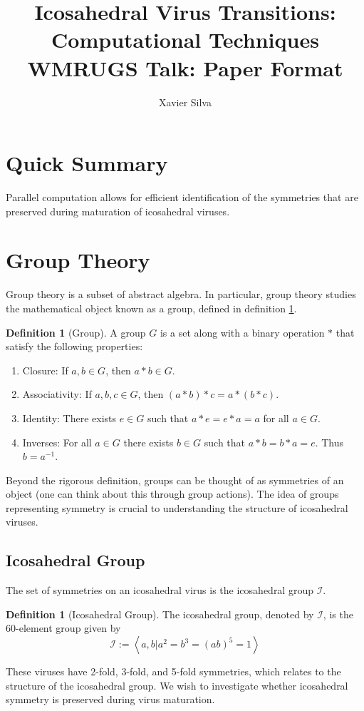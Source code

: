 \documentclass[a4paper,10pt]{article}
\title{Icosahedral Virus Transitions: Computational Techniques \\ \large WMRUGS Talk: Paper Format}
\author{Xavier Silva}
\theoremstyle{plain}
\theoremstyle{definition}
\newtheorem{Definition}[Theorem]{Definition}
\theoremstyle{remark}
\newcommand{\generatedby}[1]{\left\langle#1\right\rangle}
\begin{document}
\maketitle
\tableofcontents

\section{Quick Summary}
Parallel computation allows for efficient identification of the symmetries that are preserved during maturation of icosahedral viruses.

\section{Group Theory}
Group theory is a subset of abstract algebra.
In particular, group theory studies the mathematical object known as a group, defined in definition \ref{def:group}.
\begin{Definition}[Group]
    \label{def:group}
    A group \(G\) is a set along with a binary operation \(*\) that satisfy the following properties:
    \begin{enumerate}
        \item Closure: If \(a, b \in G\), then \(a*b \in G\).
        \item Associativity: If \(a, b, c \in G\), then \((a*b)*c = a*(b*c)\).
        \item Identity: There exists \(e \in G\) such that \(a*e = e*a = a\) for all \(a \in G\).
        \item Inverses: For all \(a \in G\) there exists \(b \in G\) such that \(a*b = b*a = e\). Thus \(b = a^{-1}\).
    \end{enumerate}
\end{Definition}
Beyond the rigorous definition, groups can be thought of as symmetries of an object (one can think about this through group actions).
The idea of groups representing symmetry is crucial to understanding the structure of icosahedral viruses.

\subsection{Icosahedral Group}
The set of symmetries on an icosahedral virus is the icosahedral group \(\mathcal{I}\).
\begin{Definition}[Icosahedral Group]
    The icosahedral group, denoted by \(\mathcal{I}\), is the 60-element group given by \[\mathcal{I} := \generatedby{a, b | a^2 = b^3 = (ab)^5 = 1}\]
\end{Definition}
These viruses have 2-fold, 3-fold, and 5-fold symmetries, which relates to the structure of the icosahedral group.
We wish to investigate whether icosahedral symmetry is preserved during virus maturation.
\end{document}

